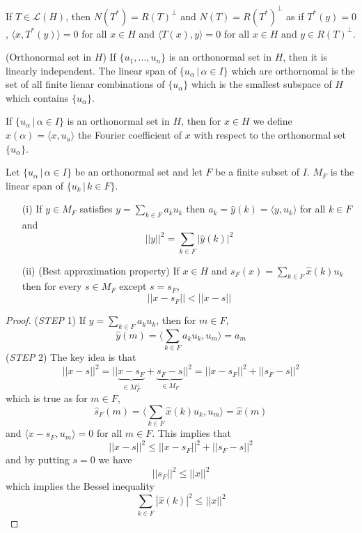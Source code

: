 \vspace{2ex}
\begin{rmk}
If $T\in \mathcal{L}(H)$, then $N(T^{*})=R(T)^{\perp}$ and $N(T)=R(T^{*})^{\perp}$ as if $T^{*}(y)=0$, $\langle x,T^{*}(y)\rangle =0$ for all $x\in H$ and $\langle T(x),y\rangle =0$ for all $x\in H$ and $y\in R(T)^{\perp}$. 
\end{rmk}
\vspace{2ex}
\begin{defi}
(Orthonormal set in $H$) If $\{u_1,\ldots ,u_{n}\}$ is an orthonormal set in $H$, then it is linearly independent. The linear span of $\{u_{\alpha } \,|\, \alpha \in I\}$ which are orthornomal is the set of all finite lienar combinations of $\{u_{\alpha }\}$ which is the smallest subspace of $H$ which contains $\{u_{\alpha }\}$.
\end{defi}
\vspace{2ex}
\begin{defi}
If $\{u_{\alpha } \,|\, \alpha \in I\}$ is an orthonormal set in $H$, then for $x\in H$ we define $\hat{x}(\alpha )=\langle x,u_{a}\rangle $ the Fourier coefficient of $x$ with respect to the orthonormal set $\{u_{\alpha }\}$.
\end{defi}
\vspace{2ex}
\begin{thm}
Let $\{u_{\alpha } \,|\, \alpha \in I\}$ be an orthonormal set and let $F$ be a finite subset of $I$. $M_{F}$ is the linear span of $\{u_{k} \,|\,k\in F\}$.
\begin{itemize}
\item[(i)] If $y\in M_{F}$ satisfies $y=\sum _{k\in F}a_{k}u_{k}$ then $a_{k}=\hat{y}(k)=\langle y,u_{k}\rangle $ for all $k\in F$ and
\[||y||^2=\sum _{k\in F}|\hat{y}(k)|^2\]
\item[(ii)] (Best approximation property) If $x\in H$ and $s_{F}(x)= \sum _{k\in F}\hat{x}(k)u_{k}$ then for every $s \in M_{F}$ except $s=s_{F}$, 
\[||x-s_{F}||<||x-s||\]
\end{itemize}
\end{thm}
\vspace{2ex}
\begin{proof}
({\it STEP} 1) If $y=\sum _{k \in F}a_{k}u_{k}$, then for $m\in F$, 
\[\hat{y}(m)=\langle \sum _{k\in F}a_{k}u_{k},u_{m}\rangle =a_{m}\]
({\it STEP} 2) The key idea is that 
\[||x-s||^2=||\underbrace{x-s_{F}}_{\in M_{F}^{\perp}}+\underbrace{s_{F}-s}_{\in M_{F}}||^2=||x-s_{F}||^2+||s_{F}-s||^2\]
which is true as for $m\in F$,
\[\hat{s}_{F}(m)=\langle \sum _{k\in F}\hat{x}(k)u_{k},u_{m}\rangle =\hat{x}(m)\]
and $\langle x-s_{F},u_{m}\rangle =0$ for all $m\in F$. This implies that
\[||x-s||^2\leq ||x-s_{F}||^2+||s_{F}-s||^2\]
and by putting $s=0$ we have
\[||s_{F}||^2\leq ||x||^2\]
which implies the Bessel inequality
\[\sum _{k\in F}|\hat{x}(k)|^2\leq ||x||^2\]

\end{proof}
\vspace{2ex}

